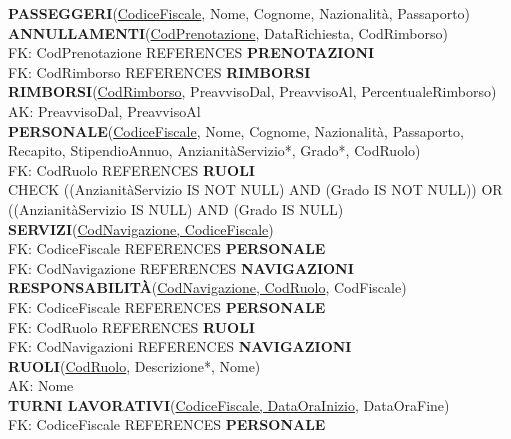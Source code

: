 \documentclass[a4paper, titlepage]{report}
\begin{document}
\noindent
\textbf{PASSEGGERI}(\underline{CodiceFiscale}, Nome, Cognome, Nazionalità, Passaporto) \\

\noindent
\textbf{ANNULLAMENTI}(\underline{CodPrenotazione}, DataRichiesta, CodRimborso)\\
FK: CodPrenotazione REFERENCES \textbf{PRENOTAZIONI}\\
FK: CodRimborso REFERENCES \textbf{RIMBORSI}\\

\noindent
\textbf{RIMBORSI}(\underline{CodRimborso}, PreavvisoDal, PreavvisoAl, PercentualeRimborso) \\
AK: PreavvisoDal, PreavvisoAl\\

\noindent
\textbf{PERSONALE}(\underline{CodiceFiscale}, Nome, Cognome, Nazionalità, Passaporto, Recapito, StipendioAnnuo, AnzianitàServizio*, Grado*, CodRuolo) \\
FK: CodRuolo REFERENCES \textbf{RUOLI} \\
CHECK ((AnzianitàServizio IS NOT NULL) AND (Grado IS NOT NULL)) OR ((AnzianitàServizio IS NULL) AND (Grado IS NULL) \\

\noindent
\textbf{SERVIZI}(\underline{CodNavigazione, CodiceFiscale}) \\
FK: CodiceFiscale REFERENCES \textbf{PERSONALE} \\
FK: CodNavigazione REFERENCES \textbf{NAVIGAZIONI} \\

\noindent
\textbf{RESPONSABILITÀ}(\underline{CodNavigazione, CodRuolo}, CodFiscale) \\
FK: CodiceFiscale REFERENCES \textbf{PERSONALE}\\
FK: CodRuolo REFERENCES \textbf{RUOLI}\\
FK: CodNavigazioni REFERENCES \textbf{NAVIGAZIONI}\\

\noindent
\textbf{RUOLI}(\underline{CodRuolo}, Descrizione*, Nome) \\
AK: Nome \\

\noindent
\textbf{TURNI LAVORATIVI}(\underline{CodiceFiscale, DataOraInizio}, DataOraFine) \\
FK: CodiceFiscale REFERENCES \textbf{PERSONALE}\\
\end{document}
